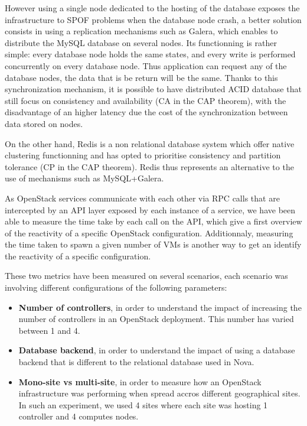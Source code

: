 However using a single node dedicated to the hosting of the database exposes the
infrastructure to SPOF problems when the database node crash, a better solution
consists in using a replication mechanisms such as Galera, which enables to
distribute the MySQL database on several nodes. Its functionning is rather
simple: every database node holds the same states, and every write is performed
concurrently on every database node. Thus application can request any of the
database nodes, the data that is be return will be the same. Thanks to this
synchronization mechanism, it is possible to have distributed ACID database that
still focus on consistency and availability (CA in the CAP theorem), with the
disadvantage of an higher latency due the cost of the synchronization between
data stored on nodes.

On the other hand, Redis is a non relational database system which offer native
clustering functionning and has opted to prioritise consistency and partition
tolerance (CP in the CAP theorem). Redis thus represents an alternative to the
use of mechanisms such as MySQL+Galera.

As OpenStack services communicate with each other via RPC calls that are
intercepted by an API layer exposed by each instance of a service, we have been
able to measure the time take by each call on the API, which give a first
overview of the reactivity of a specific OpenStack configuration. Additionnaly,
measuring the time taken to spawn a given number of VMs is another way to get an
identify the reactivity of a specific configuration. 

These two metrics have been measured on several scenarios, each scenario was
involving different configurations of the following parameters:

\begin{itemize}

\item \textbf{Number of controllers}, in order to understand the impact of increasing the
number of controllers in an OpenStack deployment. This number has varied between
1 and 4.

\item \textbf{Database backend}, in order to understand the impact of using a
database backend that is different to the relational database used in Nova.

\item \textbf{Mono-site vs multi-site}, in order to measure how an OpenStack
infrastructure was performing when spread accros different geographical sites. In
such an experiment, we used 4 sites where each site was hosting 1 controller and
4 computes nodes.

\end{itemize}

